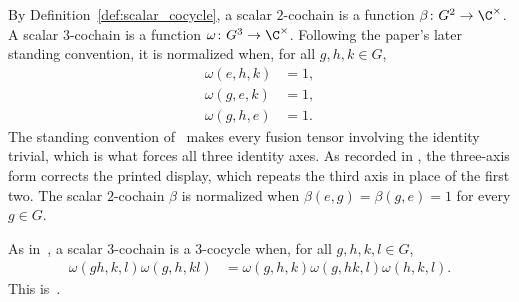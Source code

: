 \begin{definition}
    \label{def:mpug_scalar_cochains}
    \leanok
    By Definition~\ref{def:scalar_cocycle}, a scalar $2$-cochain
    is a function $\beta\colon G^2\to\C^\times$. A scalar $3$-cochain is a
    function $\omega\colon G^3\to\C^\times$. Following the paper's later
    standing convention, it is normalized when, for all $g,h,k\in G$,
    \begin{align}
        \omega(e,h,k) & = 1, \\
        \omega(g,e,k) & = 1, \\
        \omega(g,h,e) & = 1.
        \label{eq:mpug_three_normalized}
    \end{align}
    The standing convention of~\cite{FrancoRubio2025MPUGauging} makes every
    fusion tensor involving the identity trivial, which is what forces all
    three identity axes. As recorded in
    \cite{gap:fbc25_three_cocycle_normalization_typo}, the three-axis form
    corrects the printed display, which repeats the third axis in place of
    the first two.
    The scalar $2$-cochain $\beta$ is normalized when
    $\beta(e,g)=\beta(g,e)=1$ for every $g\in G$.
\end{definition}

\begin{definition}
    \label{def:mpug_three_cocycle}
    \leanok
    As in~\cite{FrancoRubio2025MPUGauging}, a scalar $3$-cochain is a
    $3$-cocycle when, for all $g,h,k,l\in G$,
    \begin{align}
        \omega(gh,k,l)\omega(g,h,kl)
         & =\omega(g,h,k)\omega(g,hk,l)\omega(h,k,l).
        \label{eq:mpug_three_cocycle}
    \end{align}
    This is~\cite[``Scalar three-cocycle'']{QICLean2026Blueprint}.
\end{definition}

